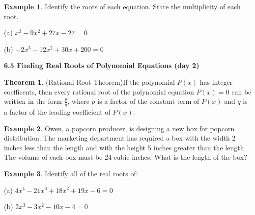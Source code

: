 \documentclass{report}
\theoremstyle{definition}
\newtheorem{example}{\bf Example}
\newtheorem{theorem}{\bf Theorem}[section]
\begin{document}
\begin{example}
Identify the roots of each equation. State the multiplicity of each root.
\end{example}

\begin{minipage}[t]{0.45\linewidth}
(a) $x^3-9x^2+27x-27=0$
\end{minipage}
\hfill
\begin{minipage}[t]{0.45\linewidth}
(b) $-2x^3-12x^2+30x+200=0$
\end{minipage}


\vfill
\noindent{}
 \newpage

\noindent \Large \textbf{6.5 Finding Real Roots of Polynomial Equations (day 2)} \normalsize

\begin{theorem}\label{RationalRootTheorem}
(Rational Root Theorem)If the polynomial $P(x)$ has integer coefficents, then every rational root of the polynomial equation $P(x)=0$ can be written in the form $\frac{p}{q}$, where $p$ is a factor of the constant term of $P(x)$ and $q$ is a factor of the leading coefficient of $P(x)$.
\end{theorem}

\vspace{0.5cm}

\begin{example}
Owen, a popcorn producer, is designing a new box for popcorn distribution. The marketing department has required a box with the width 2 inches less than the length and with the height 5 inches greater than the length. The volume of each box must be 24 cubic inches. What is the length of the box?
\end{example}
\vfill

\begin{example}
Identify all of the real roots of:
\end{example}
(a) $4x^4-21x^3+18x^2+19x-6=0$
\vfill

(b) $2x^3-3x^2-10x-4=0$






\vfill
\noindent{}
 \newpage
\end{document}
